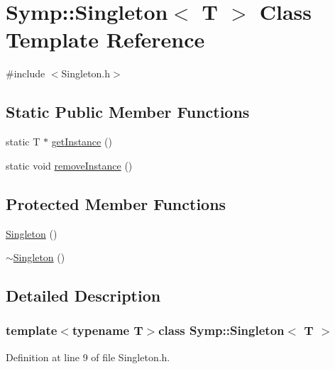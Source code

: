 \hypertarget{class_symp_1_1_singleton}{\section{Symp\-:\-:Singleton$<$ T $>$ Class Template Reference}
\label{class_symp_1_1_singleton}
}


{\ttfamily \#include $<$Singleton.\-h$>$}

\subsection*{Static Public Member Functions}
\begin{DoxyCompactItemize}
\item 
static T $\ast$ \hyperlink{class_symp_1_1_singleton_a2412fc841373411011479fe1da688fe1}{get\-Instance} ()
\item 
static void \hyperlink{class_symp_1_1_singleton_a38a9bdf838d0af33492f817319045751}{remove\-Instance} ()
\end{DoxyCompactItemize}
\subsection*{Protected Member Functions}
\begin{DoxyCompactItemize}
\item 
\hyperlink{class_symp_1_1_singleton_afe7a7830bed6c0ab39ddb6c1ca9f5a17}{Singleton} ()
\item 
\hyperlink{class_symp_1_1_singleton_aae7ca2a642d9c8486c34f5862b6dcfb5}{$\sim$\-Singleton} ()
\end{DoxyCompactItemize}


\subsection{Detailed Description}
\subsubsection*{template$<$typename T$>$class Symp\-::\-Singleton$<$ T $>$}



Definition at line 9 of file Singleton.\-h.



